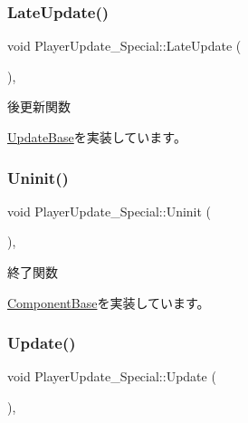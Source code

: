 \subsubsection{\texorpdfstring{Late\+Update()}{LateUpdate()}}
{\footnotesize\ttfamily void Player\+Update\+\_\+\+Special\+::\+Late\+Update (\begin{DoxyParamCaption}{ }\end{DoxyParamCaption})\hspace{0.3cm}{\ttfamily [override]}, {\ttfamily [virtual]}}



後更新関数 



\mbox{\hyperlink{class_update_base_afc4956f78135aed5fc4e4f9991be50b9}{Update\+Base}}を実装しています。

\mbox{\label{class_player_update___special_a60b5982ed56b52293a9e651ae7bf305f}} 
\subsubsection{\texorpdfstring{Uninit()}{Uninit()}}
{\footnotesize\ttfamily void Player\+Update\+\_\+\+Special\+::\+Uninit (\begin{DoxyParamCaption}{ }\end{DoxyParamCaption})\hspace{0.3cm}{\ttfamily [override]}, {\ttfamily [virtual]}}



終了関数 



\mbox{\hyperlink{class_component_base_a9f42beaf0383d6f629819579cab4de57}{Component\+Base}}を実装しています。

\mbox{\label{class_player_update___special_afef3503e292dbaded809068fd87deadd}} 
\subsubsection{\texorpdfstring{Update()}{Update()}}
{\footnotesize\ttfamily void Player\+Update\+\_\+\+Special\+::\+Update (\begin{DoxyParamCaption}{ }\end{DoxyParamCaption})\hspace{0.3cm}{\ttfamily [override]}, {\ttfamily [virtual]}}



